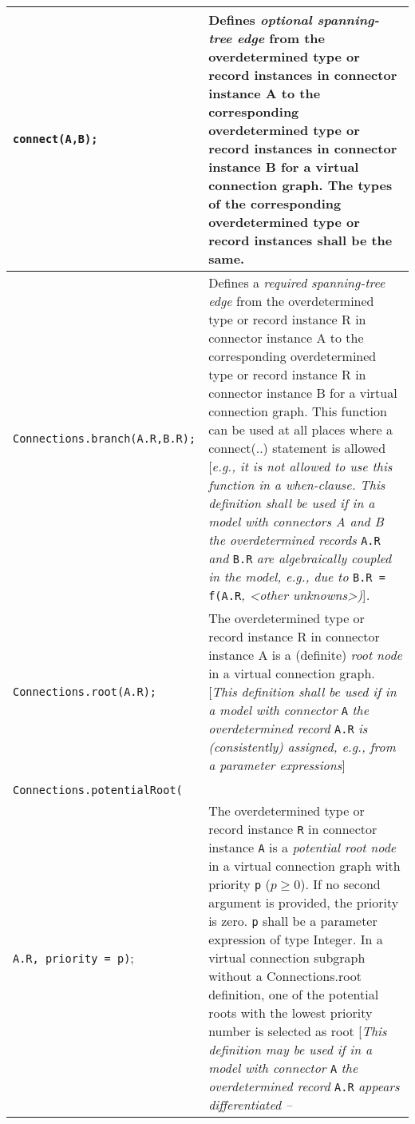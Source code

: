 \begin{longtable}[]{|p{5.1cm}|p{10cm}|}
\hline \endhead
\lstinline!connect(A,B);! & Defines \emph{optional spanning-tree edge} from the
overdetermined type or record instances in connector instance A to the
corresponding overdetermined type or record instances in connector
instance B for a virtual connection graph. The types of the
corresponding overdetermined type or record instances shall be the
same.\\ \hline
\lstinline!Connections.branch(A.R,B.R);! & Defines a \emph{required spanning-tree edge}
from the overdetermined type or record instance R in connector instance
A to the corresponding overdetermined type or record instance R in
connector instance B for a virtual connection graph. This function can
be used at all places where a connect(..) statement is allowed
{[}\emph{e.g., it is not allowed to use this function in a when-clause.
This definition shall be used if in a model with connectors A and B the
overdetermined records} \lstinline!A.R! \emph{and} \lstinline!B.R! \emph{are algebraically
coupled in the model, e.g., due to} \lstinline!B.R = f(A.R!\emph{, \textless{}other
unknowns\textgreater{})}{]}\emph{.}\\ \hline
\lstinline!Connections.root(A.R);! & The overdetermined type or record instance R in
connector instance A is a (definite) \emph{root node} in a virtual
connection graph. {[}\emph{This definition shall be used if in a model
with connector} \lstinline!A! \emph{the overdetermined record} \lstinline!A.R! \emph{is
(consistently) assigned, e.g., from a parameter
expressions}{]}\\ \hline
\begin{tabular}{@{}p{5.1cm}@{}}
\lstinline!Connections.potentialRoot(A.R);!\\
\lstinline!Connections.potentialRoot(!\\
\lstinline!A.R, priority = p)!;
\end{tabular}
& The overdetermined type or record instance \lstinline!R! in connector instance \lstinline!A! is
a \emph{potential root node} in a virtual connection graph with priority
\lstinline!p! ($p\ge 0$). If no second argument is provided, the priority is zero.
\lstinline!p! shall be a parameter expression of type Integer\emph{.} In a
virtual connection subgraph without a Connections.root definition, one
of the potential roots with the lowest priority number is selected as
root {[}\emph{This definition may be used if in a model with connector}
\lstinline!A! \emph{the overdetermined record} \lstinline!A.R! \emph{appears differentiated --}

\end{longtable}
